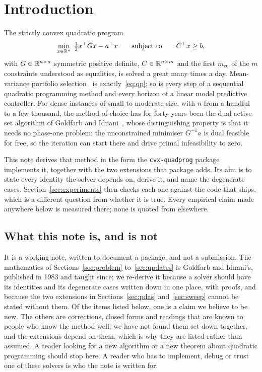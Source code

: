 \section{Introduction}
\label{sec:intro}

The strictly convex quadratic program
\begin{equation}
  \min_{x \in \mathbb{R}^n} \; \tfrac12 x^{\top} G x - a^{\top} x
  \qquad \text{subject to} \qquad C^{\top} x \ge b,
  \label{eq:qp}
\end{equation}
with $G \in \mathbb{R}^{n \times n}$ symmetric positive definite, $C \in \mathbb{R}^{n \times m}$
and the first $m_{\mathrm{eq}}$ of the $m$ constraints understood as equalities,
is solved a great many times a day. Mean-variance portfolio
selection~\cite{markowitz1952} is exactly~\eqref{eq:qp}; so is every step of a
sequential quadratic programming method and every horizon of a linear model
predictive controller. For dense instances of small to moderate size, with $n$ from
a handful to a few thousand, the method of choice has for forty years been the
dual active-set algorithm of Goldfarb and Idnani~\cite{goldfarb1982,goldfarb1983},
whose distinguishing property is that it needs no phase-one problem: the
unconstrained minimiser $G^{-1}a$ is dual feasible for free, so the iteration can
start there and drive primal infeasibility to zero.

This note derives that method in the form the \texttt{cvx-quadprog}
package~\cite{cvxquadprog} implements it, together with the two extensions that
package adds. Its aim is to state every identity the solver depends on, derive
it, and name the degenerate cases. Section~\ref{sec:experiments} then checks each
one against the code that ships, which is a different question from whether it is
true. Every empirical claim made
anywhere below is measured there; none is quoted from elsewhere.

\subsection{What this note is, and is not}
\label{ssec:status}

It is a working note, written to document a package, and not a submission. The
mathematics of Sections~\ref{sec:problem} to~\ref{sec:updates} is Goldfarb and
Idnani's, published in 1983 and taught since; we re-derive it because a solver
should have its identities and its degenerate cases written down in one place,
with proofs, and because the two extensions in Sections~\ref{sec:pdas}
and~\ref{sec:sweep} cannot be stated without them. Of the items listed below,
one is a claim we believe to be new. The others are corrections, closed forms and
readings that are known to people who know the method well; we have not found them
set down together, and the extensions depend on them, which is why they are
listed rather than assumed. A reader looking for a new algorithm or a new theorem
about quadratic programming should stop here. A reader who has to implement,
debug or trust one of these solvers is who the note is written for.


